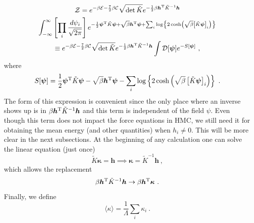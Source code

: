 \documentclass[11pt]{article}
\begin{document}
\begin{multline}\label{eqn:Z}
\mathcal{Z}=e^{-\beta\mathcal{E}-\frac{7}{2}\beta\mathcal{C}}\sqrt{\operatorname{det}\tilde K}e^{-\frac{1}{2} \beta \bm h^{\rm T} \tilde{K}^{-1} \bm h}\\
\int_{-\infty}^{\infty}\left[\prod_{i} \frac{d \psi_{i}}{\sqrt{2 \pi}}\right]
e^{-\frac{1}{2}\bm\psi^{\rm T} \tilde K\bm \psi+\sqrt{\beta}\bm h^{\rm T}\bm\psi+\sum_i\log\left\{2\cosh\left(\sqrt{\beta}\left[\tilde{K}\bm \psi\right]_i\right)\right\}}\\
\equiv e^{-\beta\mathcal{E}-\frac{7}{2}\beta\mathcal{C}}\sqrt{\operatorname{det}\tilde K}e^{-\frac{1}{2} \beta \bm h^{\rm T} \tilde{K}^{-1} \bm h}
\int\mathcal{D}[\bm\psi]
e^{-S[\bm\psi]}\ ,
\end{multline}
where
\begin{equation}\label{eqn:psi action}
S[\bm\psi]=\frac{1}{2}\bm\psi^{\rm T} \tilde K\bm \psi-\sqrt{\beta}\bm h^{\rm T}\bm\psi-\sum_i\log\left\{2\cosh\left(\sqrt{\beta}\left[\tilde{K}\bm \psi\right]_i\right)\right\}\ .
\end{equation}
The form of this expression is convenient since the only place where an inverse shows up is in $\beta \bm h^{\rm T} \tilde{K}^{-1} \bm h$ and this term is independent of the field $\psi$.  Even though this term does not impact the force equations in HMC, we still need it for obtaining the mean energy (and other quantities) when $h_i\ne 0$.  This will be more clear in the next subsections.  At the beginning of any calculation one can solve the linear equation (just once)
\begin{displaymath}
\tilde K\bm\kappa =\bm h\implies \bm \kappa = \tilde K^{-1}\bm h\ ,
\end{displaymath}
which allows the replacement
\begin{displaymath}
\beta \bm h^{\rm T} \tilde{K}^{-1} \bm h\rightarrow\beta \bm h^{\rm T}\bm \kappa\ .
\end{displaymath}
Finally, we define 
\begin{equation}
\langle \kappa\rangle =\frac{1}{\Lambda}\sum_i\kappa_i\ .
\end{equation}
\end{document}
